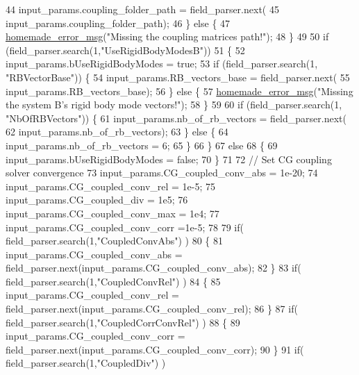 \begin{DoxyCode}
44         input\_params.coupling\_folder\_path = field\_parser.next(
45                 input\_params.coupling\_folder\_path);
46     \} \textcolor{keywordflow}{else} \{
47         \hyperlink{common__header_8h_a05d65d26b911668ac90085745dca71f6}{homemade\_error\_msg}(\textcolor{stringliteral}{"Missing the coupling matrices path!"});
48     \}
49 
50     \textcolor{keywordflow}{if} (field\_parser.search(1,\textcolor{stringliteral}{"UseRigidBodyModesB"}))
51     \{
52         input\_params.bUseRigidBodyModes = \textcolor{keyword}{true};
53         \textcolor{keywordflow}{if} (field\_parser.search(1, \textcolor{stringliteral}{"RBVectorBase"})) \{
54             input\_params.RB\_vectors\_base = field\_parser.next(
55                     input\_params.RB\_vectors\_base);
56         \} \textcolor{keywordflow}{else} \{
57             \hyperlink{common__header_8h_a05d65d26b911668ac90085745dca71f6}{homemade\_error\_msg}(\textcolor{stringliteral}{"Missing the system B's rigid body mode vectors!"});
58         \}
59                 
60         \textcolor{keywordflow}{if} (field\_parser.search(1, \textcolor{stringliteral}{"NbOfRBVectors"})) \{
61             input\_params.nb\_of\_rb\_vectors = field\_parser.next(
62                     input\_params.nb\_of\_rb\_vectors);
63         \} \textcolor{keywordflow}{else} \{
64             input\_params.nb\_of\_rb\_vectors = 6;
65         \}
66     \}
67     \textcolor{keywordflow}{else}
68     \{
69         input\_params.bUseRigidBodyModes = \textcolor{keyword}{false};
70     \}
71 
72     \textcolor{comment}{// Set CG coupling solver convergence}
73     input\_params.CG\_coupled\_conv\_abs = 1e-20;
74     input\_params.CG\_coupled\_conv\_rel = 1e-5;
75     input\_params.CG\_coupled\_div = 1e5;
76     input\_params.CG\_coupled\_conv\_max = 1e4;
77     input\_params.CG\_coupled\_conv\_corr =1e-5;
78 
79     \textcolor{keywordflow}{if}( field\_parser.search(1,\textcolor{stringliteral}{"CoupledConvAbs"}) )
80     \{
81         input\_params.CG\_coupled\_conv\_abs = field\_parser.next(input\_params.CG\_coupled\_conv\_abs);
82     \}
83     \textcolor{keywordflow}{if}( field\_parser.search(1,\textcolor{stringliteral}{"CoupledConvRel"}) )
84     \{
85         input\_params.CG\_coupled\_conv\_rel = field\_parser.next(input\_params.CG\_coupled\_conv\_rel);
86     \}
87     \textcolor{keywordflow}{if}( field\_parser.search(1,\textcolor{stringliteral}{"CoupledCorrConvRel"}) )
88     \{
89         input\_params.CG\_coupled\_conv\_corr = field\_parser.next(input\_params.CG\_coupled\_conv\_corr);
90     \}
91     \textcolor{keywordflow}{if}( field\_parser.search(1,\textcolor{stringliteral}{"CoupledDiv"}) )

\end{DoxyCode}
